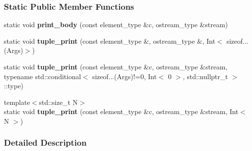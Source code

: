 \subsubsection*{Static Public Member Functions}
\begin{DoxyCompactItemize}
\item 
static void {\bfseries print\+\_\+body} (const element\+\_\+type \&c, ostream\+\_\+type \&stream)\hypertarget{structpretty__print_1_1print__container__helper_1_1printer_3_01std_1_1tuple_3_01Args_8_8_8_01_4_01_4_acbaa91391644fd8a1d6dec085680e90c}{}\label{structpretty__print_1_1print__container__helper_1_1printer_3_01std_1_1tuple_3_01Args_8_8_8_01_4_01_4_acbaa91391644fd8a1d6dec085680e90c}

\item 
static void {\bfseries tuple\+\_\+print} (const element\+\_\+type \&, ostream\+\_\+type \&, Int$<$ sizeof...(Args)$>$)\hypertarget{structpretty__print_1_1print__container__helper_1_1printer_3_01std_1_1tuple_3_01Args_8_8_8_01_4_01_4_a009dfa660ad6ce426687b83688994a60}{}\label{structpretty__print_1_1print__container__helper_1_1printer_3_01std_1_1tuple_3_01Args_8_8_8_01_4_01_4_a009dfa660ad6ce426687b83688994a60}

\item 
static void {\bfseries tuple\+\_\+print} (const element\+\_\+type \&c, ostream\+\_\+type \&stream, typename std\+::conditional$<$ sizeof...(Args)!=0, Int$<$ 0 $>$, std\+::nullptr\+\_\+t $>$\+::type)\hypertarget{structpretty__print_1_1print__container__helper_1_1printer_3_01std_1_1tuple_3_01Args_8_8_8_01_4_01_4_a6ba66be0f4a2c3be0db7485291c39452}{}\label{structpretty__print_1_1print__container__helper_1_1printer_3_01std_1_1tuple_3_01Args_8_8_8_01_4_01_4_a6ba66be0f4a2c3be0db7485291c39452}

\item 
{\footnotesize template$<$std\+::size\+\_\+t N$>$ }\\static void {\bfseries tuple\+\_\+print} (const element\+\_\+type \&c, ostream\+\_\+type \&stream, Int$<$ N $>$)\hypertarget{structpretty__print_1_1print__container__helper_1_1printer_3_01std_1_1tuple_3_01Args_8_8_8_01_4_01_4_ace240bc7f6c4b7255b855fb3e8c60d91}{}\label{structpretty__print_1_1print__container__helper_1_1printer_3_01std_1_1tuple_3_01Args_8_8_8_01_4_01_4_ace240bc7f6c4b7255b855fb3e8c60d91}

\end{DoxyCompactItemize}


\subsubsection{Detailed Description}
